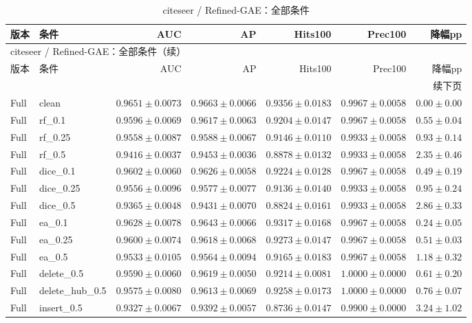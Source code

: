 \documentclass[UTF8,a4paper,11pt,fontset=fandol]{ctexart}
\begin{document}
{\footnotesize
\setlength{\tabcolsep}{3pt}
\begin{longtable}{llrrrrr}
\caption{citeseer / Refined-GAE：全部条件}\\
\toprule
版本 & 条件 & AUC & AP & Hits100 & Prec100 & 降幅pp \\
\midrule
\endfirsthead
\multicolumn{7}{l}{citeseer / Refined-GAE：全部条件（续）}\\
\toprule
版本 & 条件 & AUC & AP & Hits100 & Prec100 & 降幅pp \\
\midrule
\endhead
\midrule\multicolumn{7}{r}{续下页}\\
\endfoot
\bottomrule\endlastfoot
Full & clean & $0.9651\pm0.0073$ & $0.9663\pm0.0066$ & $0.9356\pm0.0183$ & $0.9967\pm0.0058$ & $0.00\pm0.00$ \\
Full & rf\_0.1 & $0.9596\pm0.0069$ & $0.9617\pm0.0063$ & $0.9204\pm0.0147$ & $0.9967\pm0.0058$ & $0.55\pm0.04$ \\
Full & rf\_0.25 & $0.9558\pm0.0087$ & $0.9588\pm0.0067$ & $0.9146\pm0.0110$ & $0.9933\pm0.0058$ & $0.93\pm0.14$ \\
Full & rf\_0.5 & $0.9416\pm0.0037$ & $0.9453\pm0.0036$ & $0.8878\pm0.0132$ & $0.9933\pm0.0058$ & $2.35\pm0.46$ \\
Full & dice\_0.1 & $0.9602\pm0.0060$ & $0.9626\pm0.0058$ & $0.9224\pm0.0128$ & $0.9967\pm0.0058$ & $0.49\pm0.19$ \\
Full & dice\_0.25 & $0.9556\pm0.0096$ & $0.9577\pm0.0077$ & $0.9136\pm0.0140$ & $0.9933\pm0.0058$ & $0.95\pm0.24$ \\
Full & dice\_0.5 & $0.9365\pm0.0048$ & $0.9431\pm0.0070$ & $0.8824\pm0.0161$ & $0.9933\pm0.0058$ & $2.86\pm0.33$ \\
Full & ea\_0.1 & $0.9628\pm0.0078$ & $0.9643\pm0.0066$ & $0.9317\pm0.0168$ & $0.9967\pm0.0058$ & $0.24\pm0.05$ \\
Full & ea\_0.25 & $0.9600\pm0.0074$ & $0.9618\pm0.0068$ & $0.9273\pm0.0147$ & $0.9967\pm0.0058$ & $0.51\pm0.03$ \\
Full & ea\_0.5 & $0.9533\pm0.0105$ & $0.9564\pm0.0094$ & $0.9165\pm0.0183$ & $0.9967\pm0.0058$ & $1.18\pm0.32$ \\
Full & delete\_0.5 & $0.9590\pm0.0060$ & $0.9619\pm0.0050$ & $0.9214\pm0.0081$ & $1.0000\pm0.0000$ & $0.61\pm0.20$ \\
Full & delete\_hub\_0.5 & $0.9575\pm0.0080$ & $0.9613\pm0.0069$ & $0.9258\pm0.0173$ & $1.0000\pm0.0000$ & $0.76\pm0.07$ \\
Full & insert\_0.5 & $0.9327\pm0.0067$ & $0.9392\pm0.0057$ & $0.8736\pm0.0147$ & $0.9900\pm0.0000$ & $3.24\pm1.02$ \\

\end{longtable}}
\end{document}
